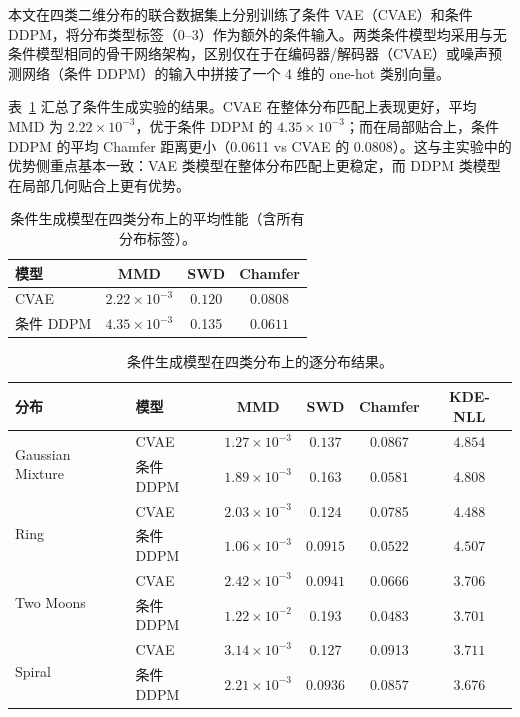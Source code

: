 \documentclass[UTF8,a4paper,12pt]{ctexart}
\begin{document}
本文在四类二维分布的联合数据集上分别训练了条件 VAE（CVAE）和条件 DDPM，将分布类型标签（0--3）作为额外的条件输入。两类条件模型均采用与无条件模型相同的骨干网络架构，区别仅在于在编码器/解码器（CVAE）或噪声预测网络（条件 DDPM）的输入中拼接了一个 4 维的 one-hot 类别向量。

表~\ref{tab:conditional} 汇总了条件生成实验的结果。CVAE 在整体分布匹配上表现更好，平均 MMD 为 $2.22\times 10^{-3}$，优于条件 DDPM 的 $4.35\times 10^{-3}$；而在局部贴合上，条件 DDPM 的平均 Chamfer 距离更小（0.0611 vs CVAE 的 0.0808）。这与主实验中的优势侧重点基本一致：VAE 类模型在整体分布匹配上更稳定，而 DDPM 类模型在局部几何贴合上更有优势。

\begin{table}[H]
\centering
\small
\caption{条件生成模型在四类分布上的平均性能（含所有分布标签）。}
\label{tab:conditional}
\begin{tabular}{lccc}
\toprule
模型 & MMD & SWD  & Chamfer \\
\midrule
CVAE & $\mathbf{2.22}\times 10^{-3}$ & $\mathbf{0.120}$ & 0.0808 \\
条件 DDPM & $4.35\times 10^{-3}$ & 0.135 & $\mathbf{0.0611}$ \\
\bottomrule
\end{tabular}
\end{table}

\begin{table}[H]
	\centering
	\footnotesize
	\caption{条件生成模型在四类分布上的逐分布结果。}
	\label{tab:conditional-detail}
	\begin{tabular}{llcccc}
		\toprule
		分布 & 模型 & MMD  & SWD  & Chamfer  & KDE-NLL  \\
		\midrule
		\multirow{2}{*}{Gaussian Mixture}
		& CVAE & $\mathbf{1.27}\times 10^{-3}$ & $\mathbf{0.137}$ & 0.0867 & $\mathbf{4.854}$ \\
		& 条件 DDPM & $1.89\times 10^{-3}$ & 0.163 & $\mathbf{0.0581}$ & 4.808 \\
		\midrule
		\multirow{2}{*}{Ring}
		& CVAE & $2.03\times 10^{-3}$ & 0.124 & 0.0785 & 4.488 \\
		& 条件 DDPM & $\mathbf{1.06}\times 10^{-3}$ & $\mathbf{0.0915}$ & $\mathbf{0.0522}$ & $\mathbf{4.507}$ \\
		\midrule
		\multirow{2}{*}{Two Moons}
		& CVAE & $\mathbf{2.42}\times 10^{-3}$ & $\mathbf{0.0941}$ & 0.0666 & 3.706 \\
		& 条件 DDPM & $1.22\times 10^{-2}$ & 0.193 & $\mathbf{0.0483}$ & $\mathbf{3.701}$ \\
		\midrule
		\multirow{2}{*}{Spiral}
		& CVAE & $3.14\times 10^{-3}$ & 0.127 & 0.0913 & $\mathbf{3.711}$ \\
		& 条件 DDPM & $\mathbf{2.21}\times 10^{-3}$ & $\mathbf{0.0936}$ & $\mathbf{0.0857}$ & 3.676 \\
		\bottomrule
	\end{tabular}
\end{table}
\end{document}
